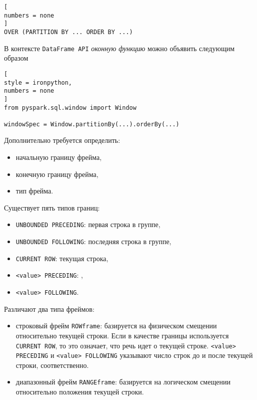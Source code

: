 \documentclass[%
	11pt,
	a4paper,
	utf8,
		]{article}
\begin{document}
\begin{lstlisting}[
numbers = none
]
OVER (PARTITION BY ... ORDER BY ...)
\end{lstlisting}

В контексте \texttt{DataFrame API} \emph{оконную функцию} можно объявить следующим образом

\begin{lstlisting}[
style = ironpython,
numbers = none
]
from pyspark.sql.window import Window

windowSpec = Window.partitionBy(...).orderBy(...)
\end{lstlisting}

Дополнительно требуется определить:

\begin{itemize}
	\item начальную границу фрейма,
	
	\item конечную границу фрейма,
	
	\item тип фрейма.
\end{itemize}

Существует пять типов границ:

\begin{itemize}
	\item \texttt{UNBOUNDED PRECEDING}: первая строка в группе,
	
	\item \texttt{UNBOUNDED FOLLOWING}: последняя строка в группе,
	
	\item \texttt{CURRENT ROW}: текущая строка,
	
	\item \texttt{<value> PRECEDING}: ,
	
	\item \texttt{<value> FOLLOWING}.
\end{itemize}

Различают два типа фреймов:

\begin{itemize}
	\item строковый фрейм \texttt{ROWframe}: базируется на физическом смещении относительно текущей строки. Если в качестве границы используется \texttt{CURRENT ROW}, то это означает, что речь идет о текущей строке. \texttt{<value> PRECEDING} и \texttt{<value> FOLLOWING} указывают число строк до и после текущей строки, соответственно.
	
	\item диапазонный фрейм \texttt{RANGEframe}: базируется на логическом смещении относительно положения текущей строки.
\end{itemize}
\end{document}
